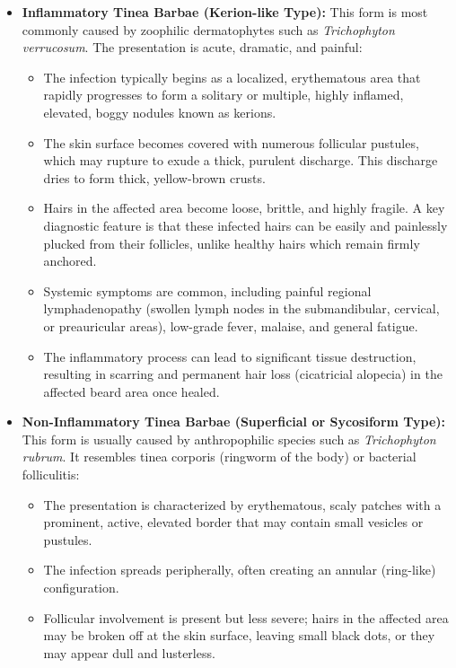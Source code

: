 \begin{itemize}
    \item \textbf{Inflammatory Tinea Barbae (Kerion-like Type):} This form is most commonly caused by zoophilic dermatophytes such as \textit{Trichophyton verrucosum}. The presentation is acute, dramatic, and painful:
    \begin{itemize}
        \item The infection typically begins as a localized, erythematous area that rapidly progresses to form a solitary or multiple, highly inflamed, elevated, boggy nodules known as kerions.
        \item The skin surface becomes covered with numerous follicular pustules, which may rupture to exude a thick, purulent discharge. This discharge dries to form thick, yellow-brown crusts.
        \item Hairs in the affected area become loose, brittle, and highly fragile. A key diagnostic feature is that these infected hairs can be easily and painlessly plucked from their follicles, unlike healthy hairs which remain firmly anchored.
        \item Systemic symptoms are common, including painful regional lymphadenopathy (swollen lymph nodes in the submandibular, cervical, or preauricular areas), low-grade fever, malaise, and general fatigue.
        \item The inflammatory process can lead to significant tissue destruction, resulting in scarring and permanent hair loss (cicatricial alopecia) in the affected beard area once healed.
    \end{itemize}
    \item \textbf{Non-Inflammatory Tinea Barbae (Superficial or Sycosiform Type):} This form is usually caused by anthropophilic species such as \textit{Trichophyton rubrum}. It resembles tinea corporis (ringworm of the body) or bacterial folliculitis:
    \begin{itemize}
        \item The presentation is characterized by erythematous, scaly patches with a prominent, active, elevated border that may contain small vesicles or pustules.
        \item The infection spreads peripherally, often creating an annular (ring-like) configuration.
        \item Follicular involvement is present but less severe; hairs in the affected area may be broken off at the skin surface, leaving small black dots, or they may appear dull and lusterless.

\end{itemize}
\end{itemize}
